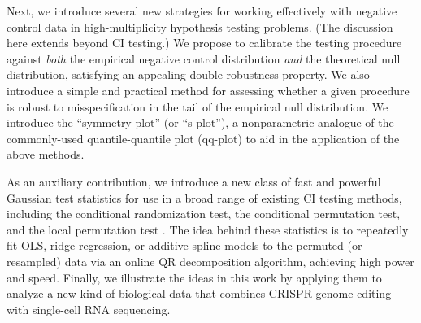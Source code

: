 \documentclass[12pt]{article}
\begin{document}
Next, we introduce several new strategies for working effectively with negative control data in high-multiplicity hypothesis testing problems. (The discussion here extends beyond CI testing.) We propose to calibrate the testing procedure against \textit{both} the empirical negative control distribution \textit{and} the theoretical null distribution, satisfying an appealing double-robustness property. We also introduce a simple and practical method for assessing whether a given procedure is robust to misspecification in the tail of the empirical null distribution. We introduce the ``symmetry plot'' (or ``s-plot''), a nonparametric analogue of the commonly-used quantile-quantile plot (qq-plot) to aid in the application of the above methods. %

As an auxiliary contribution, we introduce a new class of fast and powerful Gaussian test statistics for use in a broad range of existing CI testing methods, including the conditional randomization test, the conditional permutation test, and the local permutation test \parencite{Candes2018a,Berrett2020,Kim2021}. The idea behind these statistics is to repeatedly fit OLS, ridge regression, or additive spline models to the permuted (or resampled) data via an online QR decomposition algorithm, achieving high power and speed. %
Finally, we illustrate the ideas in this work by applying them to analyze a new kind of biological data that combines CRISPR genome editing with single-cell RNA sequencing.

\printbibliography
 
\end{document}
